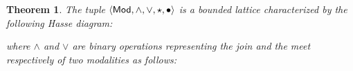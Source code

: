 \documentclass{amsart}
\newtheorem{theorem}{Theorem}[section]
\begin{document}
\begin{theorem}\label{thm:modality-is-lattice}
  The tuple $\langle\mathsf{Mod}, \land, \lor, \star, \bullet \rangle$
  is a bounded lattice characterized by the following Hasse diagram:
  \begin{center}
  \end{center}
  where $\land$ and $\lor$ are binary operations representing the join
  and the meet respectively of two modalities as follows:


\end{theorem}
\end{document}
